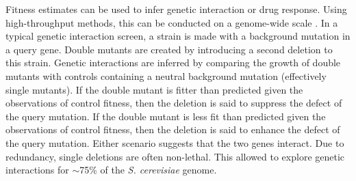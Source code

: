 

Fitness estimates can be used to infer genetic interaction or drug
response. Using high-throughput methods, this can be conducted on a
genome-wide scale \citep{Costanzo2010,Andrew2013}. In a typical
genetic interaction screen, a strain is made with a background
mutation in a query gene. Double mutants are created by introducing a
second deletion to this strain. Genetic interactions are inferred by
comparing the growth of double mutants with controls containing a
neutral background mutation (effectively single mutants). If the
double mutant is fitter than predicted given the observations of
control fitness, then the deletion is said to suppress the defect of
the query mutation. If the double mutant is less fit than predicted
given the observations of control fitness, then the deletion is said
to enhance the defect of the query mutation. Either scenario suggests
that the two genes interact. Due to redundancy, single deletions are
often non-lethal. This allowed \citet{Costanzo2010} to explore genetic
interactions for \(\sim\)75\% of the \textit{S. cerevisiae} genome.


